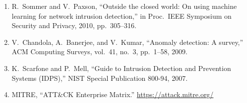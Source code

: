 \begin{enumerate}
  \item \label{src:sommer} R.~Sommer and V.~Paxson, ``Outside the closed world: On using machine learning for network intrusion detection,'' in Proc.\ IEEE Symposium on Security and Privacy, 2010, pp.~305--316.
  \item \label{src:chandola} V.~Chandola, A.~Banerjee, and V.~Kumar, ``Anomaly detection: A survey,'' ACM Computing Surveys, vol.~41, no.~3, pp.~1--58, 2009.
  \item \label{src:nist-idps} K.~Scarfone and P.~Mell, ``Guide to Intrusion Detection and Prevention Systems (IDPS),'' NIST Special Publication 800-94, 2007.
  \item \label{src:attack} MITRE, ``ATT\&CK Enterprise Matrix.'' \url{https://attack.mitre.org/}
\end{enumerate}
